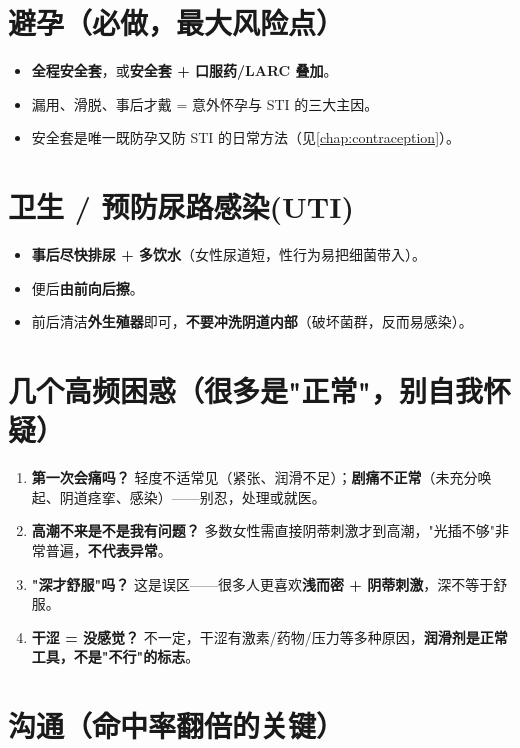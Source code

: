 \documentclass[12pt,UTF8,openany]{ctexbook}
\begin{document}
\section{避孕（必做，最大风险点）}

\begin{itemize}[leftmargin=2em,itemsep=0.3em]
  \item \textbf{全程安全套}，或\textbf{安全套 + 口服药/LARC 叠加}。
  \item 漏用、滑脱、事后才戴 = 意外怀孕与 STI 的三大主因。
  \item 安全套是唯一既防孕又防 STI 的日常方法（见\ref{chap:contraception}）。
\end{itemize}

\section{卫生 / 预防尿路感染(UTI)}

\begin{itemize}[leftmargin=2em,itemsep=0.3em]
  \item \textbf{事后尽快排尿 + 多饮水}（女性尿道短，性行为易把细菌带入）。
  \item 便后\textbf{由前向后擦}。
  \item 前后清洁\textbf{外生殖器}即可，\textbf{不要冲洗阴道内部}（破坏菌群，反而易感染）。
\end{itemize}

\section{几个高频困惑（很多是"正常"，别自我怀疑）}

\begin{enumerate}[leftmargin=2em,itemsep=0.3em]
  \item \textbf{第一次会痛吗？} 轻度不适常见（紧张、润滑不足）；\textbf{剧痛不正常}（未充分唤起、阴道痉挛、感染）——别忍，处理或就医。
  \item \textbf{高潮不来是不是我有问题？} 多数女性需直接阴蒂刺激才到高潮，"光插不够"非常普遍，\textbf{不代表异常}。
  \item \textbf{"深才舒服"吗？} 这是误区——很多人更喜欢\textbf{浅而密 + 阴蒂刺激}，深不等于舒服。
  \item \textbf{干涩 = 没感觉？} 不一定，干涩有激素/药物/压力等多种原因，\textbf{润滑剂是正常工具，不是"不行"的标志}。
\end{enumerate}

\section{沟通（命中率翻倍的关键）}
\end{document}
